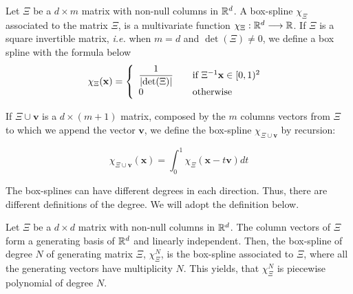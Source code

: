 \documentclass[proc]{edpsmath}
\begin{document}
\begin{dfntn}

	Let $\Xi$ be a $d \times m$ matrix with non-null columns in  $\mathbb{R}^d$. A box-spline $\chi_\Xi$ associated to the matrix $\Xi$, is a multivariate function $\chi_\Xi : \mathbb{R}^d \longrightarrow \mathbb{R}$. If $\Xi$ is a square invertible matrix, \emph{i.e.} when $m = d$ and $\det(\Xi) \neq 0$, we define a box spline with the formula below
	\begin{equation}
		\chi_{\Xi} (\mathbf{x}) = \left\{
  		\begin{array}{l l}
    		\dfrac{1}{\lvert \det(\Xi)\rvert} & \quad \text{if $\Xi^{-1}\mathbf{x} \in [0,1)^2$ }\\
    		0 & \quad \text{otherwise}
  		\end{array} \right.
	\end{equation}

	If $\Xi \cup \mathbf{v}$ is a $d \times (m + 1)$ matrix, composed by the $m$ columns vectors from $\Xi$ to which we append the vector $\mathbf{v}$, we define the box-spline $\chi_{\Xi \cup \mathbf{v}}$ by recursion:

	\begin{equation} 
	\label{eqn:boxsplines_basis}
		\chi_{\Xi \cup \mathbf{v}}(\mathbf{x}) = \int_0^ 1 \chi_\Xi(\mathbf{x}-t\mathbf{v})dt
	\end{equation}

\end{dfntn}

\rmrk The box-splines can have different degrees in each direction. Thus, there are different definitions of the degree. We will adopt the definition below.

\begin{dfntn}
Let $\Xi$ be a $d \times d$ matrix with non-null columns in $\mathbb{R}^d$. The column vectors of $\Xi$ form a generating basis of $\mathbb{R}^d$ and linearly independent. Then, the box-spline of degree $N$ of generating matrix $\Xi$, $\chi^N_\Xi$, is the box-spline associated to $\Xi$, where all the generating vectors have multiplicity $N$. This yields, that $\chi^N_\Xi$ is piecewise polynomial of degree $N$.


\end{dfntn}
\end{document}
